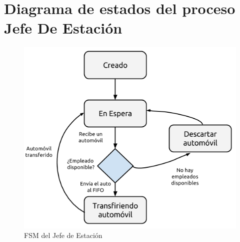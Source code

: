 \documentclass[12pt,a4paper,spanish]{article}
\begin{document}
	\section{Diagrama de estados del proceso Jefe De Estación}

	\begin{figure}[h]
	\includegraphics[scale=0.75]{FSM_JDE.png}
	\centering
	\caption{FSM del Jefe de Estación}
	\end{figure}
\end{document}
